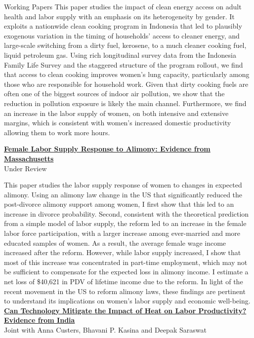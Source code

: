 \documentclass{resume} %
\begin{document}
\begin{rSection}{Working Papers}
This paper studies the impact of clean energy access on adult health and labor supply with an emphasis
on its heterogeneity by gender. It exploits a nationwide clean cooking program in Indonesia that led
to plausibly exogenous variation in the timing of households’ access to cleaner energy, and large-scale
switching from a dirty fuel, kerosene, to a much cleaner cooking fuel, liquid petroleum gas. Using rich
longitudinal survey data from the Indonesia Family Life Survey and the staggered structure of the
program rollout, we find that access to clean cooking improves women's lung capacity, particularly
among those who are responsible for household work. Given that dirty cooking fuels are often one of
the biggest sources of indoor air pollution, we show that the reduction in pollution exposure is likely
the main channel. Furthermore, we find an increase in the labor supply of women, on both intensive
and extensive margins, which is consistent with women's increased domestic productivity allowing
them to work more hours.
\vspace{.7em}

\href{https://anjalipverma.github.io/files/VermaAnjali_AlimonyLaborSupply.pdf}{\bf{\color{dark} Female Labor Supply Response to Alimony: Evidence from Massachusetts}}\\ { Under Review}

This paper studies the labor supply response of women to changes in expected alimony. Using an alimony law change in the US that significantly reduced the post-divorce alimony support among women, I first show that this led to an increase in divorce probability. Second, consistent with the theoretical prediction from a simple model of labor supply, the reform led to an increase in the female labor force participation, with a larger increase among ever-married and more educated samples of women. As a result, the average female wage income increased after the reform. However, while labor supply increased, I show that most of this increase was concentrated in part-time employment, which may not be sufficient to compensate for the expected loss in alimony income. I estimate a net loss of \$40,621 in PDV of lifetime income due to the reform. In light of the recent movement in the US to reform alimony laws, these findings are pertinent to understand its implications on women's labor supply and economic well-being.\\

\href{https://anjalipverma.github.io/files/Heat_Technology_LaborProductivity.pdf}{\bf {\color{dark}Can Technology Mitigate the Impact of Heat on Labor Productivity? Evidence from India}}\\Joint with Anna Custers, Bhavani P. Kasina and Deepak Saraswat


\end{rSection}
\end{document}
